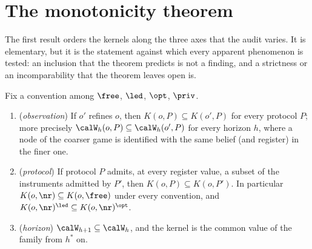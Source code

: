 \section{The monotonicity theorem}\label{sec:mono}

The first result orders the kernels along the three axes that the audit varies. It is elementary, but it is the statement against which every apparent phenomenon is tested: an inclusion that the theorem predicts is not a finding, and a strictness or an incomparability that the theorem leaves open is.

\begin{theorem}\label{thm:mono}
Fix a convention among $\free$, $\led$, $\opt$, $\priv$.
\begin{enumerate}[label=(\roman*),leftmargin=2em,itemsep=1pt]
\item (\emph{observation}) If $o'$ refines $o$, then $K(o,P)\subseteq K(o',P)$ for every protocol $P$; more precisely $\calW_h(o,P)\subseteq\calW_h(o',P)$ for every horizon $h$, where a node of the coarser game is identified with the same belief (and register) in the finer one.
\item (\emph{protocol}) If protocol $P$ admits, at every register value, a subset of the instruments admitted by $P'$, then $K(o,P)\subseteq K(o,P')$. In particular $K(o,\nr)\subseteq K(o,\free)$ under every convention, and $K(o,\nr)^{\led}\subseteq K(o,\nr)^{\opt}$.
\item (\emph{horizon}) $\calW_{h+1}\subseteq\calW_h$, and the kernel is the common value of the family from $h^{\ast}$ on.
\end{enumerate}
\end{theorem}

